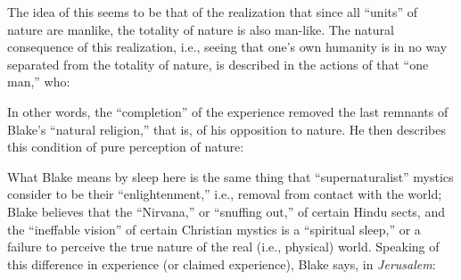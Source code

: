 
The idea of this seems to be that of the realization that since all \enquote{units} of nature
are manlike, the totality of nature is also man-like. The natural consequence of this
realization, i.e., seeing that one's own humanity is in no way separated from the totality
of nature, is described in the actions of that \enquote{one man,} who:


In other words, the \enquote{completion} of the experience removed the last remnants of Blake's
\enquote{natural religion,} that is, of his opposition to nature. He then describes this condition of
pure perception of nature:


\label{self:21}

What Blake means by sleep here is the same thing that \enquote{supernaturalist} mystics consider to be their
\enquote{enlightenment,} i.e., removal from contact with the world; Blake believes that the \enquote{Nirvana,} or
\enquote{snuffing out,} of certain Hindu sects, and the \enquote{ineffable vision} of certain Christian
mystics is a \enquote{spiritual sleep,} or a failure to perceive the true nature of the real (i.e., physical) world.
Speaking of this difference in experience (or claimed experience), Blake says, in \emph{Jerusalem}:

